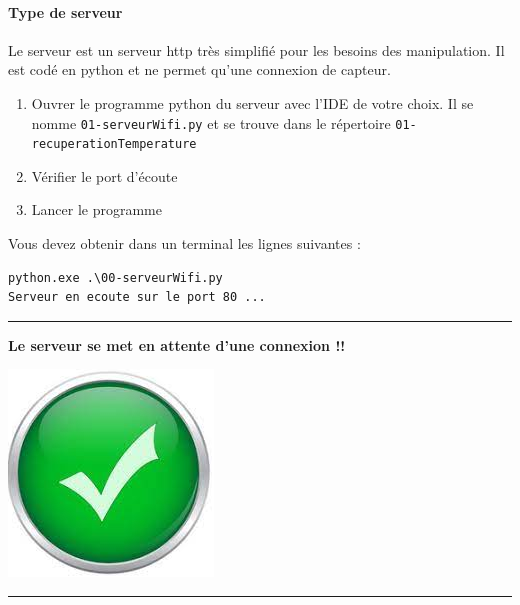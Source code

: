 \documentclass[french, 12pt]{article}%
\begin{document}
\paragraph{Type de serveur} Le serveur  est un serveur http très simplifié pour les besoins des manipulation. Il est codé en python et ne permet qu'une connexion de capteur.  

\begin{enumerate} [resume]
\item Ouvrer le programme python du serveur avec l'IDE de votre choix. Il se nomme \verb?01-serveurWifi.py? et se trouve dans le répertoire \verb?01-recuperationTemperature?
\item Vérifier le port d'écoute 
\item Lancer le programme 
\end{enumerate}

Vous devez obtenir dans un terminal les lignes suivantes : 
\begin{lstlisting}[style=commande]
python.exe .\00-serveurWifi.py
Serveur en ecoute sur le port 80 ...
\end{lstlisting}


\vspace{0.5cm}
\begin{center}
 \rule{0.75\linewidth}{1pt}
\end{center}
\begin{minipage}[c]{0.59\linewidth}

\textbf{Le serveur se met en attente d'une connexion !!}
\end{minipage}
\begin{minipage}[c]{0.4\linewidth}
\begin{center}
\includegraphics[scale=0.1]{./ressource/OKLogo}
\end{center}
\end{minipage}
\begin{center}
 \rule{0.75\linewidth}{1pt}
\end{center}
\end{document}
